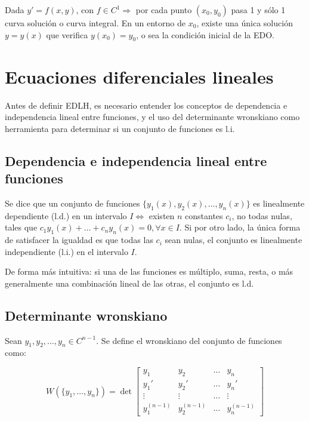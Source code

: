 \documentclass{article}
\begin{document}
Dada $y' = f(x,y)$, con $f \in C^1 \Rightarrow$ por cada punto $(x_0, y_0)$ pasa 1 y sólo 1 curva solución o curva integral. En un entorno de $x_0$, existe una única solución $y = y(x)$ que verifica $y(x_0) = y_0$, o sea la condición inicial de la EDO.

\newpage

\section{Ecuaciones diferenciales lineales}

Antes de definir EDLH, es necesario entender los conceptos de dependencia e independencia lineal entre funciones, y el uso del determinante wronskiano como herramienta para determinar si un conjunto de funciones es l.i.

\subsection{Dependencia e independencia lineal entre funciones}

Se dice que un conjunto de funciones $\{y_1(x), y_2(x), \ldots, y_n(x) \}$ es linealmente dependiente (l.d.) en un intervalo $I \Leftrightarrow$ existen $n$ constantes $c_i$, no todas nulas, tales que $c_1 y_1(x) + \ldots + c_n y_n(x) = 0, \forall x \in I$. Si por otro lado, la única forma de satisfacer la igualdad es que todas las $c_i$ sean nulas, el conjunto es linealmente independiente (l.i.) en el intervalo $I$.

De forma más intuitiva: si una de las funciones es múltiplo, suma, resta, o más generalmente una combinación lineal de las otras, el conjunto es l.d.

\subsection{Determinante wronskiano}

Sean $y_1, y_2, \ldots, y_n \in C^{n-1}$. Se define el wronskiano del conjunto de funciones como:

\begin{equation}
W(\{y_1, \ldots, y_n\}) = \det
\begin{bmatrix}
y_1 & y_2 & \ldots & y_n \\
y_1' & y_2' & \ldots & y_n' \\
\vdots & \vdots & \ldots & \vdots \\
y_1^{(n-1)} & y_2^{(n-1)} & \ldots & y_n^{(n-1)}
\end{bmatrix}
\end{equation}
\end{document}
